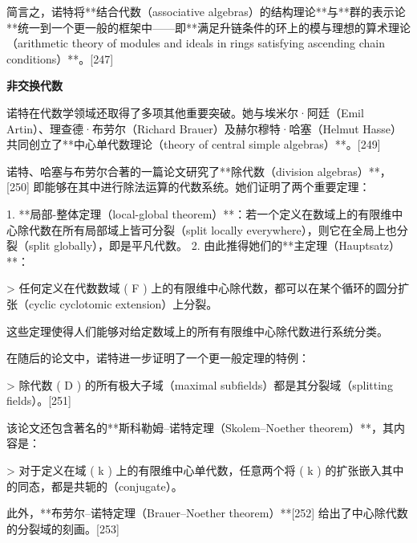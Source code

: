 简言之，诺特将**结合代数（associative algebras）的结构理论**与**群的表示论**统一到一个更一般的框架中——即**满足升链条件的环上的模与理想的算术理论（arithmetic theory of modules and ideals in rings satisfying ascending chain conditions）**。[247]



\textbf{非交换代数}

诺特在代数学领域还取得了多项其他重要突破。她与埃米尔·阿廷（Emil Artin）、理查德·布劳尔（Richard Brauer）及赫尔穆特·哈塞（Helmut Hasse）共同创立了**中心单代数理论（theory of central simple algebras）**。[249]

诺特、哈塞与布劳尔合著的一篇论文研究了**除代数（division algebras）**，[250] 即能够在其中进行除法运算的代数系统。她们证明了两个重要定理：

1. **局部-整体定理（local-global theorem）**：若一个定义在数域上的有限维中心除代数在所有局部域上皆可分裂（split locally everywhere），则它在全局上也分裂（split globally），即是平凡代数。
2. 由此推得她们的**主定理（Hauptsatz）**：

   > 任何定义在代数数域 ( F ) 上的有限维中心除代数，都可以在某个循环的圆分扩张（cyclic cyclotomic extension）上分裂。

这些定理使得人们能够对给定数域上的所有有限维中心除代数进行系统分类。

在随后的论文中，诺特进一步证明了一个更一般定理的特例：

> 除代数 ( D ) 的所有极大子域（maximal subfields）都是其分裂域（splitting fields）。[251]

该论文还包含著名的**斯科勒姆–诺特定理（Skolem–Noether theorem）**，其内容是：

> 对于定义在域 ( k ) 上的有限维中心单代数，任意两个将 ( k ) 的扩张嵌入其中的同态，都是共轭的（conjugate）。

此外，**布劳尔–诺特定理（Brauer–Noether theorem）**[252] 给出了中心除代数的分裂域的刻画。[253]
